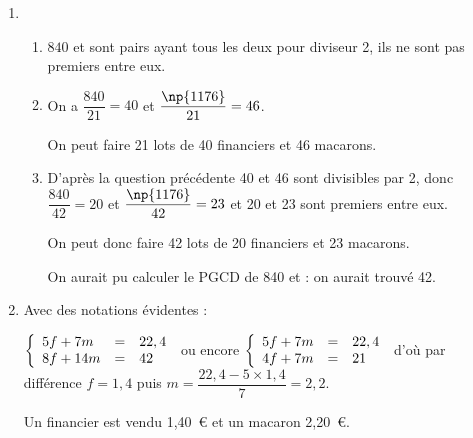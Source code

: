 
\medskip 


\medskip

\begin{enumerate}
\item 
	\begin{enumerate}
		\item %
$840$ et  sont pairs ayant tous les deux pour diviseur 2, ils ne sont pas premiers entre eux.  
		\item %
On a $\dfrac{840}{21} = 40$ et $\dfrac{\np{1176}}{21} = 46$.

On peut faire 21 lots de 40 financiers et 46 macarons. 
		\item %
D'après la question précédente 40 et 46 sont divisibles par 2, donc $\dfrac{840}{42} = 20$ et $\dfrac{\np{1176}}{42} = 23$ et 20 et 23 sont premiers entre eux.

On peut donc faire 42 lots de 20 financiers et 23 macarons.

On aurait pu calculer le PGCD de 840 et  : on aurait trouvé 42.
	\end{enumerate}
\item %


Avec des notations évidentes :

$\left\{\begin{array}{l c l}
5f + 7m&=&22,4\\
8f + 14m&=&42
\end{array}\right.$ ou encore $\left\{\begin{array}{l c l}
5f + 7m&=&22,4\\
4f + 7m&=&21
\end{array}\right.$ d'où par différence $f = 1,4$ puis $m = \dfrac{22,4 - 5\times 1,4}{7} = 2,2$.

Un financier est vendu 1,40~\euro{} et un macaron 2,20~\euro.
\end{enumerate}

\bigskip


